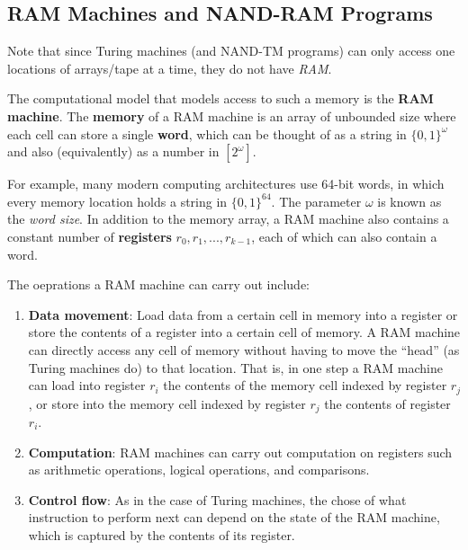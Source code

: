   \subsection{RAM Machines and NAND-RAM Programs}
  Note that since Turing machines (and NAND-TM programs) can only access one locations of arrays/tape at a time, they do not have \textit{RAM}.

  \begin{definition}
  The computational model that models access to such a memory is the \textbf{RAM machine}. The \textbf{memory} of a RAM machine is an array of unbounded size where each cell can store a single \textbf{word}, which can be thought of as a string in $\{0,1\}^\omega$ and also (equivalently) as a number in $[2^\omega]$. 
  \end{definition}

  For example, many modern computing architectures use 64-bit words, in which every memory location holds a string in $\{0,1\}^{64}$. The parameter $\omega$ is known as the \textit{word size}. In addition to the memory array, a RAM machine also contains a constant number of \textbf{registers} $r_0, r_1, ..., r_{k-1}$, each of which can also contain a word. 

  The oeprations a RAM machine can carry out include: 
  \begin{enumerate}
      \item \textbf{Data movement}: Load data from a certain cell in memory into a register or store the contents of a register into a certain cell of memory. A RAM machine can directly access any cell of memory without having to move the “head” (as Turing machines do) to that location. That is, in one step a RAM machine can load into register $r_i$ the contents of the memory cell indexed by register $r_j$, or store into the memory cell indexed by register $r_j$ the contents of register $r_i$. 
      \item \textbf{Computation}: RAM machines can carry out computation on registers such as arithmetic operations, logical operations, and comparisons. 
      \item \textbf{Control flow}: As in the case of Turing machines, the chose of what instruction to perform next can depend on the state of the RAM machine, which is captured by the contents of its register. 
  \end{enumerate}

